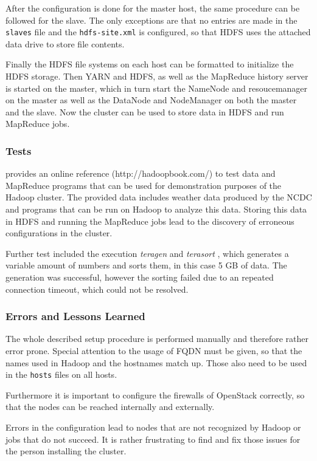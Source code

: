 After the configuration is done for the master host, the same procedure can be followed for the slave. 
The only exceptions are that no entries are made in the \texttt{slaves} file 
and the \texttt{hdfs-site.xml} is configured, so that \ac{HDFS} uses the attached data drive to store file contents.

Finally the \ac{HDFS} file systems on each host can be formatted to initialize the \ac{HDFS} storage.
Then \ac{YARN} and \ac{HDFS}, as well as the MapReduce history server is started on the master, 
which in turn start the NameNode and resoucemanager on the master 
as well as the DataNode and NodeManager on both the master and the slave.
Now the cluster can be used to store data in \ac{HDFS} and run MapReduce jobs.

\subsubsection{Tests}
\autocite[][]{white2015hadoop} provides an online reference (http://hadoopbook.com/)
to test data and MapReduce programs 
that can be used for demonstration purposes of the Hadoop cluster.
The provided data includes weather data produced by the \ac{NCDC} and programs that can be run on Hadoop to analyze this data. 
Storing this data in \ac{HDFS} and running the MapReduce jobs lead to the discovery of erroneous configurations in the cluster.

Further test included the execution \emph{teragen} and \emph{terasort} \autocite[][]{omally2008terasort}, which generates a variable amount of numbers and sorts them, in this case 5 \ac{GB} of data. 
The generation  was successful, however the sorting failed due to an repeated connection timeout, which could not be resolved.

\subsubsection{Errors and Lessons Learned}
The whole described setup procedure is performed manually 
and therefore rather error prone.
Special attention to the usage of \acs{FQDN} must be given, 
so that the names used in Hadoop and the hostnames match up.
Those also need to be used in the \texttt{hosts} files on all hosts.

Furthermore it is important to configure the firewalls of OpenStack correctly, 
so that the nodes can be reached internally and externally.

Errors in the configuration lead to nodes that are not recognized by Hadoop or jobs that do not succeed.
It is rather frustrating to find and fix those issues for the person installing the cluster.

